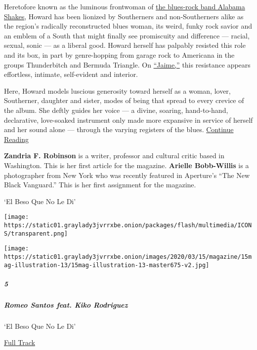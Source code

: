 Heretofore known as the luminous frontwoman of
\href{https://www.nytimes3xbfgragh.onion/2015/03/22/magazine/alabama-shakess-soul-stirring-shape-shifting-new-sound.html}{the
blues-rock band Alabama Shakes}, Howard has been lionized by Southerners
and non-Southerners alike as the region's radically reconstructed blues
woman, its weird, funky rock savior and an emblem of a South that might
finally see promiscuity and difference --- racial, sexual, sonic --- as
a liberal good. Howard herself has palpably resisted this role and its
box, in part by genre-hopping from garage rock to Americana in the
groups Thunderbitch and Bermuda Triangle. On
\href{https://www.nytimes3xbfgragh.onion/2019/09/05/arts/music/brittany-howard-jaime.html}{``Jaime,''}
this resistance appears effortless, intimate, self-evident and interior.

Here, Howard models luscious generosity toward herself as a woman,
lover, Southerner, daughter and sister, modes of being that spread to
every crevice of the album. She deftly guides her voice --- a divine,
soaring, hand-to-hand, declarative, love-soaked instrument only made
more expansive in service of herself and her sound alone --- through the
varying registers of the blues.
\href{https://www.nytimes3xbfgragh.onion/interactive/2020/03/11/magazine/brittany-howard.html}{Continue
Reading}

\textbf{Zandria F. Robinson} is a writer, professor and cultural critic
based in Washington. This is her first article for the magazine.
\textbf{Arielle Bobb-Willis} is a photographer from New York who was
recently featured in Aperture's ``The New Black Vanguard.'' This is her
first assignment for the magazine.

`El Beso Que No Le Di'

\texttt{[image: https://static01.graylady3jvrrxbe.onion/packages/flash/multimedia/ICONS/transparent.png]}

\texttt{[image: https://static01.graylady3jvrrxbe.onion/images/2020/03/15/magazine/15mag-illustration-13/15mag-illustration-13-master675-v2.jpg]}

\hypertarget{5}{%
\subparagraph{5}\label{5}}

\hypertarget{romeo-santos-feat-kiko-rodriguez}{%
\subparagraph{Romeo Santos feat. Kiko
Rodriguez}\label{romeo-santos-feat-kiko-rodriguez}}

`El Beso Que No Le Di'

\href{https://open.spotify.com/track/2kcc5humLS6PKOI9rwvXex?si=5BkZZdxsT_WRJZdWOzyqeg}{
Full Track}

